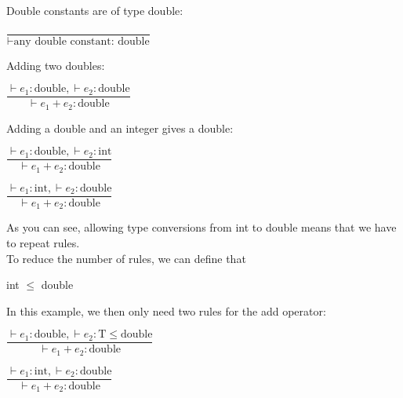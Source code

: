 Double constants are of type double:
\begin{center}
    $\dfrac{}{\vdash \text{any double constant: double}}$
\end{center}

Adding two doubles:
\begin{center}
    $\dfrac{\vdash e_1: \text{double}, \vdash e_2: \text{double} }{\vdash e_1 + e_2: \text{double}}$
\end{center}

Adding a double and an integer gives a double:
\begin{center}
    $\dfrac{\vdash e_1: \text{double}, \vdash e_2: \text{int} }{\vdash e_1 + e_2: \text{double}}$
\end{center}
\begin{center}
    $\dfrac{\vdash e_1: \text{int}, \vdash e_2: \text{double}}{\vdash e_1 + e_2: \text{double}}$
\end{center}

As you can see, allowing type conversions from int to double means that we have to repeat rules. \\
To reduce the number of rules, we can define that

\begin{center}
    int $\le$ double
\end{center}

In this example, we then only need two rules for the add operator:

\begin{center}
    $\dfrac{\vdash e_1: \text{double}, \vdash e_2: \text{T} \le \text{double}}{\vdash e_1 + e_2: \text{double}}$ \\
\end{center}
\begin{center}    
    $\dfrac{\vdash e_1: \text{int}, \vdash e_2: \text{double}}{\vdash e_1 + e_2: \text{double}}$
\end{center}